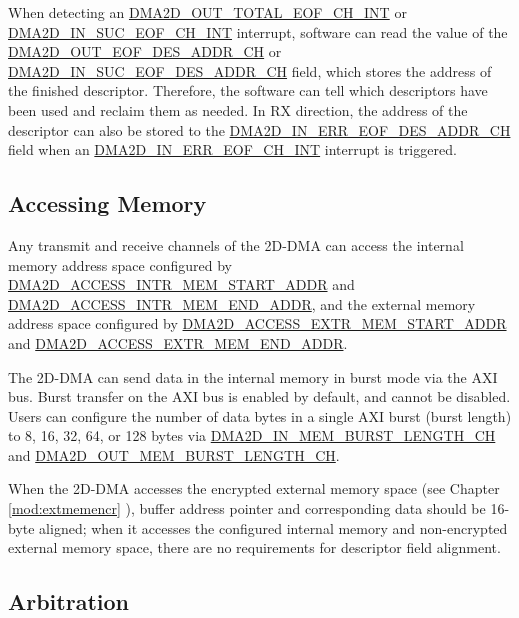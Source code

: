 \documentclass[main\_\_EN.tex]{subfiles}
\begin{document}
When detecting an \hyperref[int:DMA2DOUTTOTALEOFINT]{DMA2D\_OUT\_TOTAL\_EOF\_CH\_INT} or \hyperref[int:DMA2DINSUCEOFINT]{DMA2D\_IN\_SUC\_EOF\_CH\_INT} interrupt, software can read the value of the \hyperref[fielddesc:DMA2DOUTEOFDESADDRCHN]{DMA2D\_OUT\_EOF\_DES\_ADDR\_CH} or \hyperref[fielddesc:DMA2DINSUCEOFDESADDRCHN]{DMA2D\_IN\_SUC\_EOF\_DES\_ADDR\_CH} field, which stores the address of the finished descriptor. Therefore, the software can tell which descriptors have been used and reclaim them as needed. In RX direction, the address of the descriptor can also be stored to the \hyperref[fielddesc:DMA2DINERREOFDESADDRCHN]{DMA2D\_IN\_ERR\_EOF\_DES\_ADDR\_CH} field when an \hyperref[int:DMA2DINERREOFINT]{DMA2D\_IN\_ERR\_EOF\_CH\_INT} interrupt is triggered.


\subsection{Accessing Memory}\label{sec:dma2d-access-ram}

Any transmit and receive channels of the 2D-DMA can access the internal memory address space configured by \hyperref[fielddesc:DMA2DACCESSINTRMEMSTARTADDR]{DMA2D\_ACCESS\_INTR\_MEM\_START\_ADDR} and \hyperref[fielddesc:DMA2DACCESSINTRMEMENDADDR]{DMA2D\_ACCESS\_INTR\_MEM\_END\_ADDR}, and the external memory address space configured by \hyperref[fielddesc:DMA2DACCESSEXTRMEMSTARTADDR]{DMA2D\_ACCESS\_EXTR\_MEM\_START\_ADDR} and \hyperref[fielddesc:DMA2DACCESSEXTRMEMENDADDR]{DMA2D\_ACCESS\_EXTR\_MEM\_END\_ADDR}.

The 2D-DMA can send data in the internal memory in burst mode via the AXI bus. Burst transfer on the AXI bus is enabled by default, and cannot be disabled. Users can configure the number of data bytes in a single AXI burst (burst length) to 8, 16, 32, 64, or 128 bytes via \hyperref[fielddesc:DMA2DINMEMBURSTLENGTHCHN]{DMA2D\_IN\_MEM\_BURST\_LENGTH\_CH} and \hyperref[fielddesc:DMA2DOUTMEMBURSTLENGTHCHN]{DMA2D\_OUT\_MEM\_BURST\_LENGTH\_CH}.

When the 2D-DMA accesses the encrypted external memory space (see Chapter \ref{mod:extmemencr} \textit{}), buffer address pointer and corresponding data should be 16-byte aligned; when it accesses the configured internal memory and non-encrypted external memory space, there are no requirements for descriptor field alignment.


\subsection{Arbitration}
\end{document}
